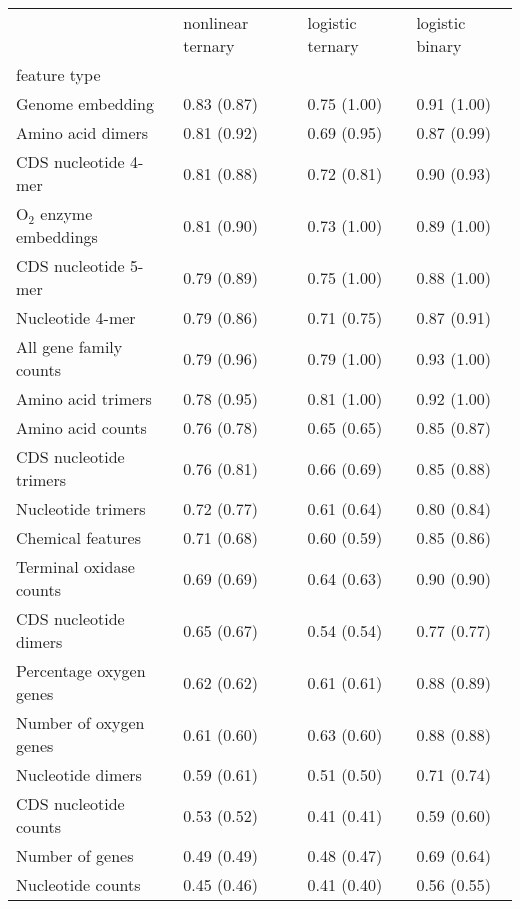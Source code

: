 \begin{tabular}{llll}
\toprule
 & nonlinear ternary & logistic ternary & logistic binary \\
feature type &  &  &  \\
\midrule
Genome embedding & 0.83 (0.87) & 0.75 (1.00) & 0.91 (1.00) \\
Amino acid dimers & 0.81 (0.92) & 0.69 (0.95) & 0.87 (0.99) \\
CDS nucleotide 4-mer & 0.81 (0.88) & 0.72 (0.81) & 0.90 (0.93) \\
O$_2$ enzyme embeddings & 0.81 (0.90) & 0.73 (1.00) & 0.89 (1.00) \\
CDS nucleotide 5-mer & 0.79 (0.89) & 0.75 (1.00) & 0.88 (1.00) \\
Nucleotide 4-mer & 0.79 (0.86) & 0.71 (0.75) & 0.87 (0.91) \\
All gene family counts & 0.79 (0.96) & 0.79 (1.00) & 0.93 (1.00) \\
Amino acid trimers & 0.78 (0.95) & 0.81 (1.00) & 0.92 (1.00) \\
Amino acid counts & 0.76 (0.78) & 0.65 (0.65) & 0.85 (0.87) \\
CDS nucleotide trimers & 0.76 (0.81) & 0.66 (0.69) & 0.85 (0.88) \\
Nucleotide trimers & 0.72 (0.77) & 0.61 (0.64) & 0.80 (0.84) \\
Chemical features & 0.71 (0.68) & 0.60 (0.59) & 0.85 (0.86) \\
Terminal oxidase counts & 0.69 (0.69) & 0.64 (0.63) & 0.90 (0.90) \\
CDS nucleotide dimers & 0.65 (0.67) & 0.54 (0.54) & 0.77 (0.77) \\
Percentage oxygen genes & 0.62 (0.62) & 0.61 (0.61) & 0.88 (0.89) \\
Number of oxygen genes & 0.61 (0.60) & 0.63 (0.60) & 0.88 (0.88) \\
Nucleotide dimers & 0.59 (0.61) & 0.51 (0.50) & 0.71 (0.74) \\
CDS nucleotide counts & 0.53 (0.52) & 0.41 (0.41) & 0.59 (0.60) \\
Number of genes & 0.49 (0.49) & 0.48 (0.47) & 0.69 (0.64) \\
Nucleotide counts & 0.45 (0.46) & 0.41 (0.40) & 0.56 (0.55) \\
\bottomrule
\end{tabular}

